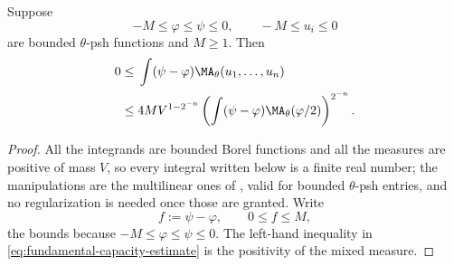 \begin{lemma}
\label{lem:fundamental-capacity-estimate}
Suppose
\[
 -M\leq\varphi\leq\psi\leq0,\qquad
 -M\leq u_i\leq0
\]
are bounded $\theta$-psh functions and $M\geq1$. Then
\begin{equation}
\label{eq:fundamental-capacity-estimate}
\begin{split}
 0\leq{}&\int(\psi-\varphi)
       \MA_\theta(u_1,\ldots,u_n)\\
 \leq{}&4M V^{1-2^{-n}}
 \left(\int(\psi-\varphi)
       \MA_\theta(\varphi/2)\right)^{2^{-n}}.
\end{split}
\end{equation}
\end{lemma}

\begin{proof}
All the integrands are bounded Borel functions and all the measures are
positive of mass $V$, so every integral written below is a finite real
number; the manipulations are the multilinear ones of
, valid for bounded $\theta$-psh
entries, and no regularization is needed once those are granted.  Write
\[
 f:=\psi-\varphi,\qquad 0\leq f\leq M ,
\]
the bounds because $-M\leq\varphi\leq\psi\leq0$.  The left-hand inequality
in \eqref{eq:fundamental-capacity-estimate} is the positivity of the mixed
measure.


\end{proof}
